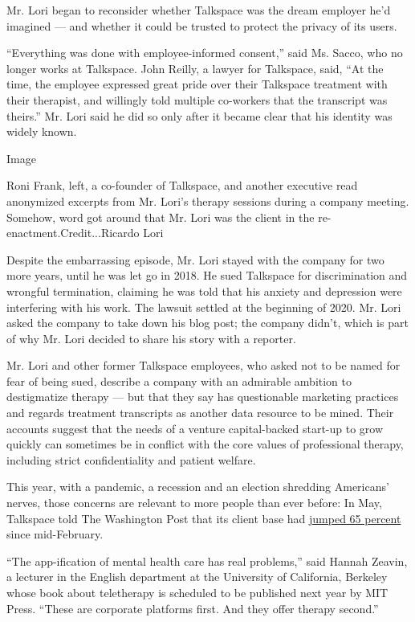 Mr. Lori began to reconsider whether Talkspace was the dream employer
he'd imagined --- and whether it could be trusted to protect the privacy
of its users.

``Everything was done with employee-informed consent,'' said Ms. Sacco,
who no longer works at Talkspace. John Reilly, a lawyer for Talkspace,
said, ``At the time, the employee expressed great pride over their
Talkspace treatment with their therapist, and willingly told multiple
co-workers that the transcript was theirs.'' Mr. Lori said he did so
only after it became clear that his identity was widely known.

Image

Roni Frank, left, a co-founder of Talkspace, and another executive read
anonymized excerpts from Mr. Lori's therapy sessions during a company
meeting. Somehow, word got around that Mr. Lori was the client in the
re-enactment.Credit...Ricardo Lori

Despite the embarrassing episode, Mr. Lori stayed with the company for
two more years, until he was let go in 2018. He sued Talkspace for
discrimination and wrongful termination, claiming he was told that his
anxiety and depression were interfering with his work. The lawsuit
settled at the beginning of 2020. Mr. Lori asked the company to take
down his blog post; the company didn't, which is part of why Mr. Lori
decided to share his story with a reporter.

Mr. Lori and other former Talkspace employees, who asked not to be named
for fear of being sued, describe a company with an admirable ambition to
destigmatize therapy --- but that they say has questionable marketing
practices and regards treatment transcripts as another data resource to
be mined. Their accounts suggest that the needs of a venture
capital-backed start-up to grow quickly can sometimes be in conflict
with the core values of professional therapy, including strict
confidentiality and patient welfare.

This year, with a pandemic, a recession and an election shredding
Americans' nerves, those concerns are relevant to more people than ever
before: In May, Talkspace told The Washington Post that its client base
had
\href{https://www.washingtonpost.com/health/2020/05/04/mental-health-coronavirus/}{jumped
65 percent} since mid-February.

``The app-ification of mental health care has real problems,'' said
Hannah Zeavin, a lecturer in the English department at the University of
California, Berkeley whose book about teletherapy is scheduled to be
published next year by MIT Press. ``These are corporate platforms first.
And they offer therapy second.''

